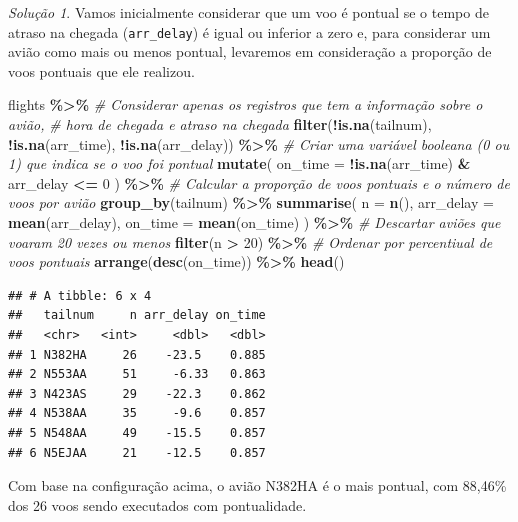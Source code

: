 \documentclass[
]{latex/krantz}
\newenvironment{Shaded}{\begin{snugshade}}{\end{snugshade}}
\newcommand{\AttributeTok}[1]{\textcolor[rgb]{0.13,0.29,0.53}{#1}}
\newcommand{\CommentTok}[1]{\textcolor[rgb]{0.56,0.35,0.01}{\textit{#1}}}
\newcommand{\DecValTok}[1]{\textcolor[rgb]{0.00,0.00,0.81}{#1}}
\newcommand{\FunctionTok}[1]{\textcolor[rgb]{0.13,0.29,0.53}{\textbf{#1}}}
\newcommand{\NormalTok}[1]{#1}
\newcommand{\SpecialCharTok}[1]{\textcolor[rgb]{0.81,0.36,0.00}{\textbf{#1}}}
\theoremstyle{definition}
\theoremstyle{definition}
\theoremstyle{definition}
\theoremstyle{definition}
\theoremstyle{remark}
\newtheorem*{solution}{Solução}
\begin{document}
\begin{solution}
Vamos inicialmente considerar que um voo é pontual se o tempo de atraso na chegada (\texttt{arr\_delay}) é igual ou inferior a zero e, para considerar um avião como mais ou menos pontual, levaremos em consideração a proporção de voos pontuais que ele realizou.

\begin{Shaded}
\begin{Highlighting}[]
\NormalTok{flights }\SpecialCharTok{\%\textgreater{}\%}
    \CommentTok{\# Considerar apenas os registros que tem a informação sobre o avião, }
    \CommentTok{\# hora de chegada e atraso na chegada}
    \FunctionTok{filter}\NormalTok{(}\SpecialCharTok{!}\FunctionTok{is.na}\NormalTok{(tailnum), }\SpecialCharTok{!}\FunctionTok{is.na}\NormalTok{(arr\_time), }\SpecialCharTok{!}\FunctionTok{is.na}\NormalTok{(arr\_delay)) }\SpecialCharTok{\%\textgreater{}\%}
    \CommentTok{\# Criar uma variável booleana (0 ou 1) que indica se o voo foi pontual}
    \FunctionTok{mutate}\NormalTok{(}
        \AttributeTok{on\_time =} \SpecialCharTok{!}\FunctionTok{is.na}\NormalTok{(arr\_time) }\SpecialCharTok{\&}\NormalTok{ arr\_delay }\SpecialCharTok{\textless{}=} \DecValTok{0}
\NormalTok{    ) }\SpecialCharTok{\%\textgreater{}\%}
    \CommentTok{\# Calcular a proporção de voos pontuais e o número de voos por avião}
    \FunctionTok{group\_by}\NormalTok{(tailnum) }\SpecialCharTok{\%\textgreater{}\%}
    \FunctionTok{summarise}\NormalTok{(}
        \AttributeTok{n =} \FunctionTok{n}\NormalTok{(),}
        \AttributeTok{arr\_delay =} \FunctionTok{mean}\NormalTok{(arr\_delay),}
        \AttributeTok{on\_time =} \FunctionTok{mean}\NormalTok{(on\_time)}
\NormalTok{    ) }\SpecialCharTok{\%\textgreater{}\%}
    \CommentTok{\# Descartar aviões que voaram 20 vezes ou menos}
    \FunctionTok{filter}\NormalTok{(n }\SpecialCharTok{\textgreater{}} \DecValTok{20}\NormalTok{) }\SpecialCharTok{\%\textgreater{}\%}
    \CommentTok{\# Ordenar por percentiual de voos pontuais}
    \FunctionTok{arrange}\NormalTok{(}\FunctionTok{desc}\NormalTok{(on\_time)) }\SpecialCharTok{\%\textgreater{}\%}
    \FunctionTok{head}\NormalTok{()}
\end{Highlighting}
\end{Shaded}

\begin{verbatim}
## # A tibble: 6 x 4
##   tailnum     n arr_delay on_time
##   <chr>   <int>     <dbl>   <dbl>
## 1 N382HA     26    -23.5    0.885
## 2 N553AA     51     -6.33   0.863
## 3 N423AS     29    -22.3    0.862
## 4 N538AA     35     -9.6    0.857
## 5 N548AA     49    -15.5    0.857
## 6 N5EJAA     21    -12.5    0.857
\end{verbatim}

Com base na configuração acima, o avião N382HA é o mais pontual, com 88,46\% dos 26 voos sendo executados com pontualidade.
\end{solution}
\end{document}
